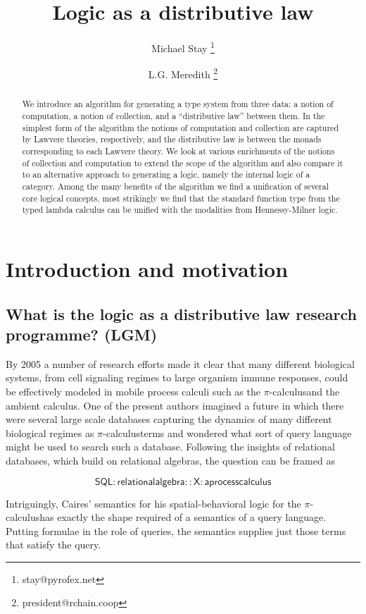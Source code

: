 \documentclass{article}
\title{Logic as a distributive law}
\author[1]{Michael Stay \thanks{\fontsize{8}{8}\selectfont stay@pyrofex.net}}
\author[2]{L.G. Meredith \thanks{\fontsize{8}{8}\selectfont president@rchain.coop}}
\affil[1]{Pyrofex Corp.}
\affil[2]{RChain Coop.}
\renewcommand{\:}{\colon}
\newcommand{\pic}{$\pi$-calculus}
\begin{document}
\maketitle

\begin{abstract}
  \noindent
  We introduce an algorithm for generating a type system from three
  data: a notion of computation, a notion of collection, and a
  ``distributive law'' between them. In the simplest form of the
  algorithm the notions of computation and collection are captured by
  Lawvere theories, respectively, and the distributive law is between
  the monads corresponding to each Lawvere theory. We look at various
  enrichments of the notions of collection and computation to extend
  the scope of the algorithm and also compare it to an alternative
  approach to generating a logic, namely the internal logic of a
  category. Among the many benefits of the algorithm we find a
  unification of several core logical concepts, most strikingly we
  find that the standard function type from the typed lambda calculus
  can be unified with the modalities from Hennessy-Milner logic.
\end{abstract}

\section{Introduction and motivation}
\subsection{What is the logic as a distributive law research
  programme? (LGM)}
By 2005 a number of research efforts made it clear that many different
biological systems, from cell signaling regimes to large organism
immune responses, could be effectively modeled in mobile process
calculi such as the \pic and the ambient
calculus. \cite{CardelliBio}\cite{Priami}\cite{Aviv} One of
the present authors imagined a future in which there were several
large scale databases capturing the dynamics of many different
biological regimes as \pic terms and wondered what sort of
query language might be used to search such a database. Following the
insights of relational databases, which build on relational algebras,
the question can be framed as

\[\mathsf{SQL} : \mathsf{relational algebra} :: \mathsf{X} : \mathsf{a process calculus}\]

Intriguingly, Caires' semantics for his spatial-behavioral
logic for the \pic has exactly the shape required of a
semantics of a query language. Putting formulae in the role of
queries, the semantics supplies just those terms that satisfy the
query.
\end{document}

